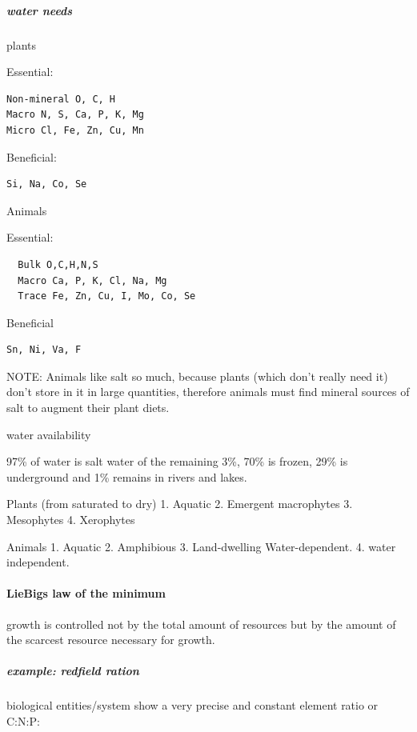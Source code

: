 \documentclass[]{article}
\let\oldparagraph\paragraph
\renewcommand{\paragraph}[1]{\oldparagraph{#1}\mbox{}}
\let\oldsubparagraph\subparagraph
\renewcommand{\subparagraph}[1]{\oldsubparagraph{#1}\mbox{}}
\begin{document}
\hypertarget{water-needs}{%
\subparagraph{water needs}\label{water-needs}}

plants

Essential:

\begin{verbatim}
Non-mineral O, C, H
Macro N, S, Ca, P, K, Mg
Micro Cl, Fe, Zn, Cu, Mn
\end{verbatim}

Beneficial:

\begin{verbatim}
Si, Na, Co, Se
\end{verbatim}

Animals

Essential:

\begin{verbatim}
  Bulk O,C,H,N,S
  Macro Ca, P, K, Cl, Na, Mg
  Trace Fe, Zn, Cu, I, Mo, Co, Se
\end{verbatim}

Beneficial

\begin{verbatim}
Sn, Ni, Va, F
\end{verbatim}

NOTE: Animals like salt so much, because plants (which don't really need
it) don't store in it in large quantities, therefore animals must find
mineral sources of salt to augment their plant diets.

water availability

97\% of water is salt water of the remaining 3\%, 70\% is frozen, 29\%
is underground and 1\% remains in rivers and lakes.

Plants (from saturated to dry) 1. Aquatic 2. Emergent macrophytes 3.
Mesophytes 4. Xerophytes

Animals 1. Aquatic 2. Amphibious 3. Land-dwelling Water-dependent. 4.
water independent.

\hypertarget{liebigs-law-of-the-minimum}{%
\paragraph{LieBigs law of the
minimum}\label{liebigs-law-of-the-minimum}}

growth is controlled not by the total amount of resources but by the
amount of the scarcest resource necessary for growth.

\hypertarget{example-redfield-ration}{%
\subparagraph{example: redfield ration}\label{example-redfield-ration}}

biological entities/system show a very precise and constant element
ratio or C:N:P:
\end{document}

